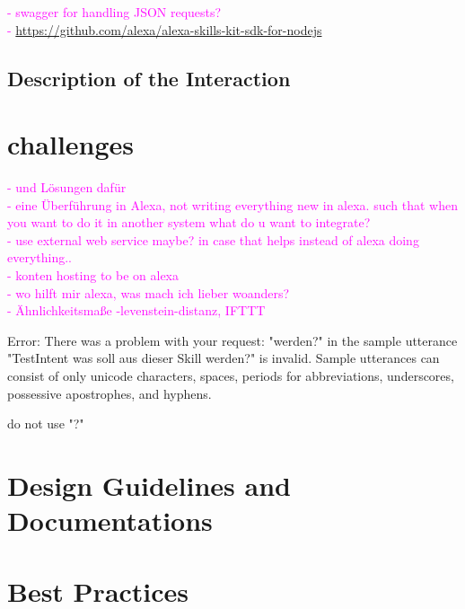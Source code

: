 \textcolor{magenta}{
- swagger for handling JSON requests?\\
- \url{https://github.com/alexa/alexa-skills-kit-sdk-for-nodejs}
}


\subsection*{Description of the Interaction}


\section{challenges}

\textcolor{magenta}{
- und L\"osungen daf\"ur\\
- eine \"Uberf\"uhrung in Alexa, not writing everything new in alexa. such that when you want to do it in another system what do u want to integrate?\\
- use external web service maybe? in case that helps instead of alexa doing everything..\\
- konten hosting to be on alexa\\
- wo hilft mir alexa, was mach ich lieber woanders?\\
- \"Ahnlichkeitsma{\ss}e -levenstein-distanz, IFTTT
}


Error: There was a problem with your request: "werden?" in the sample utterance "TestIntent was soll aus dieser Skill werden?" is invalid. Sample utterances can consist of only unicode characters, spaces, periods for abbreviations, underscores, possessive apostrophes, and hyphens.

do not use "?"



\section{Design Guidelines and Documentations}
\label{designGuide}





\section{Best Practices}

